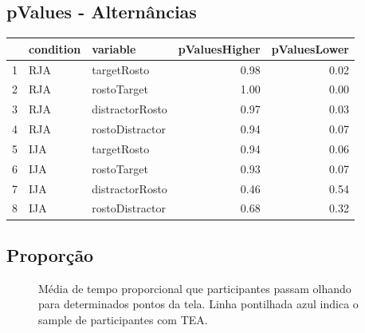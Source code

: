 \documentclass{article}
\begin{document}
\subsection{pValues - Alternâncias}

\begin{table}[ht]
\centering
\begin{tabular}{rllrr}
  \hline
 & condition & variable & pValuesHigher & pValuesLower \\ 
  \hline
1 & RJA & targetRosto & 0.98 & 0.02 \\ 
  2 & RJA & rostoTarget & 1.00 & 0.00 \\ 
  3 & RJA & distractorRosto & 0.97 & 0.03 \\ 
  4 & RJA & rostoDistractor & 0.94 & 0.07 \\ 
  5 & IJA & targetRosto & 0.94 & 0.06 \\ 
  6 & IJA & rostoTarget & 0.93 & 0.07 \\ 
  7 & IJA & distractorRosto & 0.46 & 0.54 \\ 
  8 & IJA & rostoDistractor & 0.68 & 0.32 \\ 
   \hline
\end{tabular}
\end{table}

\subsection{Proporção}

\begin{figure}[H]
  \caption{Média de tempo proporcional que participantes passam olhando para determinados pontos da tela. Linha pontilhada azul indica o sample de participantes com TEA.}
  \noindent{}
  \centering
\end{figure}
\end{document}
